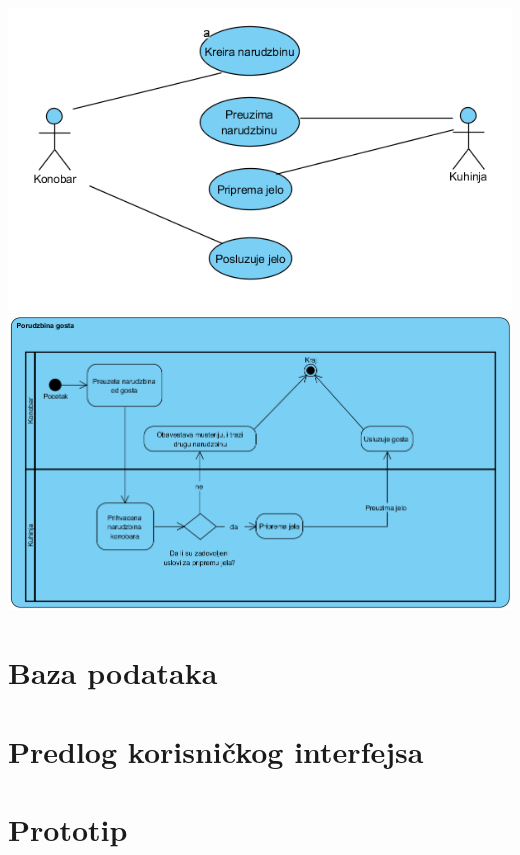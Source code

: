 \documentclass{article}
\begin{document}
\includegraphics[width=\textwidth]{SU_7_konobar_kuhinja.png}
\includegraphics[width=\textwidth]{SU_7_porudzbina.png}


\section{Baza podataka}


\section{Predlog korisničkog interfejsa}


\section{Prototip}

\end{document}
